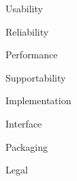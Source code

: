 
{Usability}

{Reliability}

{Performance}

{Supportability}

{Implementation}

{Interface}

{Packaging}

{Legal}



















